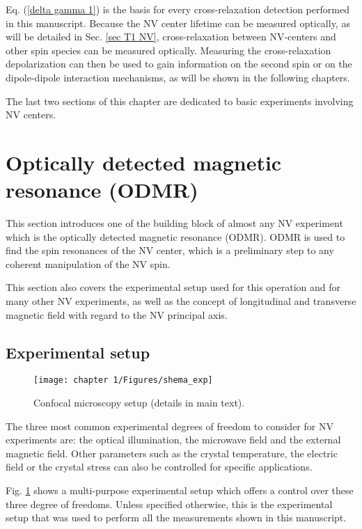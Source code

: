 \documentclass[a4paper, 11pt]{report}
\begin{document}
Eq. (\ref{delta gamma 1}) is the basis for every cross-relaxation detection performed in this manuscript. Because the NV center lifetime can be measured optically, as will be detailed in Sec. \ref{sec T1 NV}, cross-relaxation between NV-centers and other spin species can be measured optically. Measuring the cross-relaxation depolarization can then be used to gain information on the second spin or on the dipole-dipole interaction mechanisms, as will be shown in the following chapters.

The last two sections of this chapter are dedicated to basic experiments involving NV centers.

\section{Optically detected magnetic resonance (ODMR)}

This section introduces one of the building block of almost any NV experiment which is the optically detected magnetic resonance (ODMR). ODMR is used to find the spin resonances of the NV center, which is a preliminary step to any coherent manipulation of the NV spin.

This section also covers the experimental setup used for this operation and for many other NV experiments, as well as the concept of longitudinal and transverse magnetic field with regard to the NV principal axis.

\subsection{Experimental setup}
\label{Sec setup cahp 1}
\begin{figure}[h!]
\centering
\texttt{[image: chapter 1/Figures/shema\_exp]}
\caption{Confocal microscopy setup (details in main text).}
\label{setup ch1}
\end{figure}
The three most common experimental degrees of freedom to consider for NV experiments are: the optical illumination, the microwave field and the external magnetic field. Other parameters such as the crystal temperature, the electric field or the crystal stress can also be controlled for specific applications.

Fig. \ref{setup ch1} shows a multi-purpose experimental setup which offers a control over these three degree of freedoms. Unless specified otherwise, this is the experimental setup that was used to perform all the measurements shown in this manuscript. 
\end{document}

